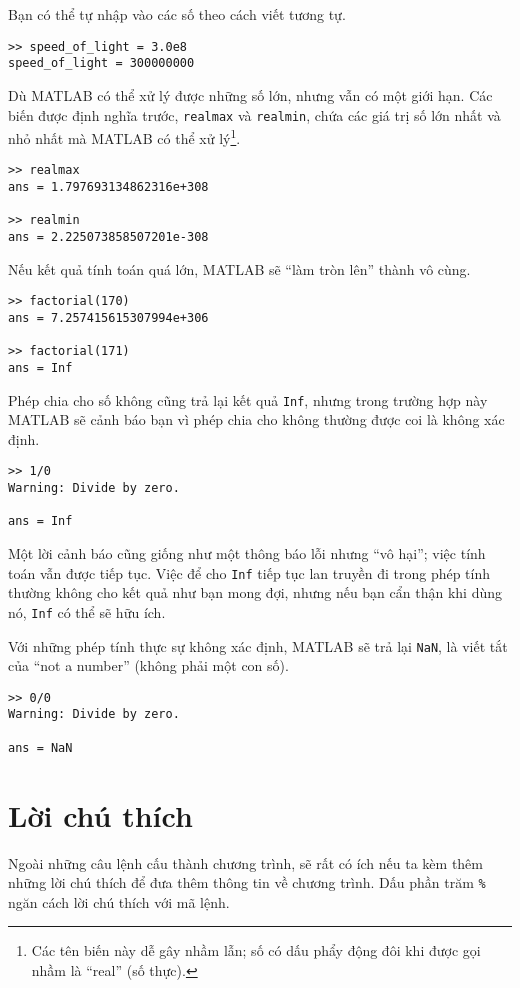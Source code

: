 \documentclass[12pt]{book}
\begin{document}
Bạn có thể tự nhập vào các số theo cách viết tương tự.

\begin{verbatim}
>> speed_of_light = 3.0e8
speed_of_light = 300000000
\end{verbatim}
%
Dù MATLAB có thể xử lý được những số lớn, nhưng vẫn có một giới hạn.
Các biến được định nghĩa trước, {\tt realmax} và {\tt realmin}, chứa các 
giá trị số lớn nhất và nhỏ nhất mà MATLAB có thể xử lý\footnote{Các
tên biến này dễ gây nhầm lẫn; số có dấu phẩy động đôi khi được gọi
nhầm là ``real'' (số thực).}.

\begin{verbatim}
>> realmax
ans = 1.797693134862316e+308

>> realmin
ans = 2.225073858507201e-308
\end{verbatim}
%
Nếu kết quả tính toán quá lớn, MATLAB sẽ ``làm tròn lên'' thành
vô cùng.

\begin{verbatim}
>> factorial(170)
ans = 7.257415615307994e+306

>> factorial(171)
ans = Inf
\end{verbatim}
%
Phép chia cho số không cũng trả lại kết quả {\tt Inf}, nhưng trong 
trường hợp này MATLAB sẽ cảnh báo bạn vì phép chia cho không
thường được coi là không xác định.

\begin{verbatim}
>> 1/0
Warning: Divide by zero.

ans = Inf
\end{verbatim}
%
Một lời cảnh báo cũng giống như một thông báo lỗi nhưng ``vô hại''; 
việc tính toán vẫn được tiếp tục. Việc để cho {\tt Inf} tiếp tục lan 
truyền đi trong phép tính thường không cho kết quả như bạn mong đợi,
nhưng nếu bạn cẩn thận khi dùng nó, {\tt Inf} có thể sẽ hữu ích.

Với những phép tính thực sự không xác định, MATLAB sẽ trả lại {\tt NaN},
là viết tắt của ``not a number'' (không phải một con số).

\begin{verbatim}
>> 0/0
Warning: Divide by zero.

ans = NaN
\end{verbatim}



\section{Lời chú thích}

Ngoài những câu lệnh cấu thành chương trình, sẽ rất có ích nếu ta kèm
thêm những lời chú thích để đưa thêm thông tin về chương trình. Dấu
phần trăm {\tt \%} ngăn cách lời chú thích với mã lệnh.
\end{document}
